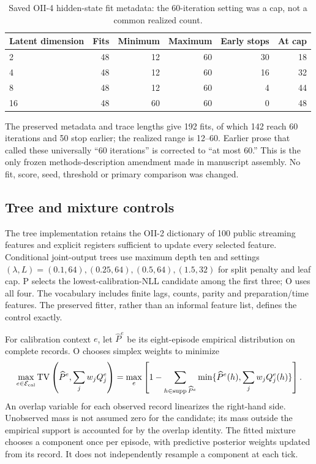 \begin{table}[tbp]
\centering
\caption{Saved OII-4 hidden-state fit metadata: the 60-iteration setting was a cap, not a common realized count.}\label{tab:em}
\small
\setlength{\tabcolsep}{5pt}
\begin{tabular}{lrrrrr}
\toprule
Latent dimension & Fits & Minimum & Maximum & Early stops & At cap \\
\midrule
2 & 48 & 12 & 60 & 30 & 18 \\
4 & 48 & 12 & 60 & 16 & 32 \\
8 & 48 & 12 & 60 & 4 & 44 \\
16 & 48 & 60 & 60 & 0 & 48 \\
\bottomrule
\end{tabular}
\par{}
\end{table}



The preserved metadata and trace lengths give 192 fits, of which 142 reach 60 iterations and 50 stop earlier; the realized range is 12--60. Earlier prose that called these universally ``60 iterations'' is corrected to ``at most 60.'' This is the only frozen methods-description amendment made in manuscript assembly. No fit, score, seed, threshold or primary comparison was changed.

\subsection{Tree and mixture controls}
The tree implementation retains the OII-2 dictionary of 100 public streaming features and explicit registers sufficient to update every selected feature. Conditional joint-output trees use maximum depth ten and settings $(\lambda,L)=(0.1,64),(0.25,64),(0.5,64),(1.5,32)$ for split penalty and leaf cap. P selects the lowest-calibration-NLL candidate among the first three; O uses all four. The vocabulary includes finite lags, counts, parity and preparation/time features. The preserved fitter, rather than an informal feature list, defines the control exactly.

For calibration context $e$, let $\widehat P^e$ be its eight-episode empirical distribution on complete records. O chooses simplex weights to minimize
\begin{equation}\label{eq:mixture-select}
 \max_{e\in\mathcal E_{\rm cal}}\operatorname{TV}\left(\widehat P^e,\sum_jw_jQ_j^e\right)
 =\max_e\left[1-\sum_{h\in\operatorname{supp}\widehat P^e}
       \min\{\widehat P^e(h),\sum_jw_jQ_j^e(h)\}\right].
\end{equation}
An overlap variable for each observed record linearizes the right-hand side. Unobserved mass is not assumed zero for the candidate; its mass outside the empirical support is accounted for by the overlap identity. The fitted mixture chooses a component once per episode, with predictive posterior weights updated from its record. It does not independently resample a component at each tick.

